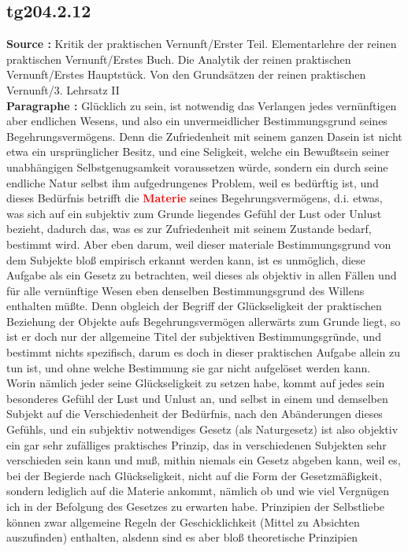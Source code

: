 \documentclass[a4paper,12pt,twoside]{book}
\newcommand{\match}[1]{\textcolor{red}{\textbf{#1}}}
\begin{document}
	\subsection*{tg204.2.12} 
	\textbf{Source : }Kritik der praktischen Vernunft/Erster Teil. Elementarlehre der reinen praktischen Vernunft/Erstes Buch. Die Analytik der reinen praktischen Vernunft/Erstes Hauptstück. Von den Grundsätzen der reinen praktischen Vernunft/3. Lehrsatz II\\  
	
	\noindent\textbf{Paragraphe : }Glücklich zu sein, ist notwendig das Verlangen jedes vernünftigen aber endlichen Wesens, und also ein unvermeidlicher Bestimmungsgrund seines Begehrungsvermögens. Denn die Zufriedenheit mit seinem ganzen Dasein ist nicht etwa ein ursprünglicher Besitz, und eine Seligkeit, welche ein Bewußtsein seiner unabhängigen Selbstgenugsamkeit voraussetzen würde, sondern ein durch seine endliche Natur selbst ihm aufgedrungenes Problem, weil es bedürftig ist, und dieses Bedürfnis betrifft die \match{Materie} seines Begehrungsvermögens, d.i. etwas, was sich auf ein subjektiv zum Grunde liegendes Gefühl der Lust oder Unlust bezieht, dadurch das, was es zur Zufriedenheit mit seinem Zustande bedarf, bestimmt wird. Aber eben darum, weil dieser materiale Bestimmungsgrund von dem Subjekte bloß empirisch erkannt werden kann, ist es unmöglich, diese Aufgabe als ein Gesetz zu betrachten, weil dieses als objektiv in allen Fällen und für alle vernünftige Wesen eben denselben Bestimmungsgrund des Willens enthalten müßte. Denn obgleich der Begriff der Glückseligkeit der praktischen Beziehung der Objekte aufs Begehrungsvermögen allerwärts zum Grunde liegt, so ist er doch nur der allgemeine Titel der subjektiven Bestimmungsgründe, und bestimmt nichts spezifisch, darum es doch in dieser praktischen Aufgabe allein zu tun ist, und ohne welche Bestimmung sie gar nicht aufgelöset werden kann. Worin nämlich jeder seine Glückseligkeit zu setzen habe, kommt auf jedes sein besonderes Gefühl der Lust und Unlust an, und selbst in einem und demselben Subjekt auf die Verschiedenheit der Bedürfnis, nach den Abänderungen dieses Gefühls, und ein subjektiv notwendiges Gesetz (als Naturgesetz) ist also objektiv ein gar sehr zufälliges praktisches Prinzip, das in verschiedenen Subjekten sehr verschieden sein kann und  muß, mithin niemals ein Gesetz abgeben kann, weil es, bei der Begierde nach Glückseligkeit, nicht auf die Form der Gesetzmäßigkeit, sondern lediglich auf die Materie ankommt, nämlich ob und wie viel Vergnügen ich in der Befolgung des Gesetzes zu erwarten habe. Prinzipien der Selbstliebe können zwar allgemeine Regeln der Geschicklichkeit (Mittel zu Absichten auszufinden) enthalten, alsdenn sind es aber bloß theoretische Prinzipien
	
\end{document}
